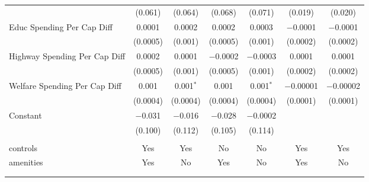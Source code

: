 \begin{table}[!htbp]
\begin{tabular}{@{\extracolsep{5pt}}lcccccc}
  & (0.061) & (0.064) & (0.068) & (0.071) & (0.019) & (0.020) \\ 
  Educ Spending Per Cap Diff & 0.0001 & 0.0002 & 0.0002 & 0.0003 & $-$0.0001 & $-$0.0001 \\ 
  & (0.0005) & (0.001) & (0.0005) & (0.001) & (0.0002) & (0.0002) \\ 
  Highway Spending Per Cap Diff & 0.0002 & 0.0001 & $-$0.0002 & $-$0.0003 & 0.0001 & 0.0001 \\ 
  & (0.0005) & (0.001) & (0.0005) & (0.001) & (0.0002) & (0.0002) \\ 
  Welfare Spending Per Cap Diff & 0.001 & 0.001$^{*}$ & 0.001 & 0.001$^{*}$ & $-$0.00001 & $-$0.00002 \\ 
  & (0.0004) & (0.0004) & (0.0004) & (0.0004) & (0.0001) & (0.0001) \\ 
  Constant & $-$0.031 & $-$0.016 & $-$0.028 & $-$0.0002 &  &  \\ 
  & (0.100) & (0.112) & (0.105) & (0.114) &  &  \\ 
 \hline \\[-1.8ex] 
controls & Yes & Yes & No & No & Yes & Yes \\ 
amenities & Yes & No & Yes & No & Yes & No \\ 
\hline \\[-1.8ex] 
\hline 
\hline \\[-1.8ex] 
\end{tabular} 
\end{table} 
